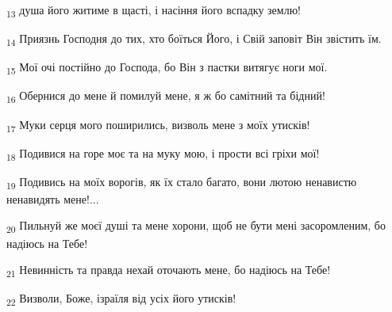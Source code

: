 \begin{tcolorbox}
\textsubscript{13} душа його житиме в щасті, і насіння його вспадку землю!
\end{tcolorbox}
\begin{tcolorbox}
\textsubscript{14} Приязнь Господня до тих, хто боїться Його, і Свій заповіт Він звістить їм.
\end{tcolorbox}
\begin{tcolorbox}
\textsubscript{15} Мої очі постійно до Господа, бо Він з пастки витягує ноги мої.
\end{tcolorbox}
\begin{tcolorbox}
\textsubscript{16} Обернися до мене й помилуй мене, я ж бо самітний та бідний!
\end{tcolorbox}
\begin{tcolorbox}
\textsubscript{17} Муки серця мого поширились, визволь мене з моїх утисків!
\end{tcolorbox}
\begin{tcolorbox}
\textsubscript{18} Подивися на горе моє та на муку мою, і прости всі гріхи мої!
\end{tcolorbox}
\begin{tcolorbox}
\textsubscript{19} Подивись на моїх ворогів, як їх стало багато, вони лютою ненавистю ненавидять мене!...
\end{tcolorbox}
\begin{tcolorbox}
\textsubscript{20} Пильнуй же моєї душі та мене хорони, щоб не бути мені засоромленим, бо надіюсь на Тебе!
\end{tcolorbox}
\begin{tcolorbox}
\textsubscript{21} Невинність та правда нехай оточають мене, бо надіюсь на Тебе!
\end{tcolorbox}
\begin{tcolorbox}
\textsubscript{22} Визволи, Боже, ізраїля від усіх його утисків!
\end{tcolorbox}
